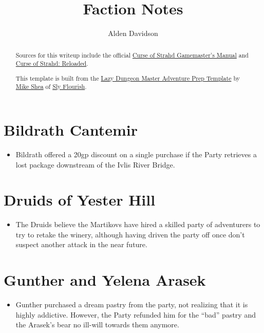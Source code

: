 \documentclass[a4paper,11pt]{article}
\title{Faction Notes}
\author{Alden Davidson}
\begin{document}
\maketitle
\tableofcontents

\begin{abstract}
  Sources for this writeup include the official
  \href{https://5e.tools/adventure.html#cos}{Curse of Strahd Gamemaster's Manual} and
  \href{https://www.reddit.com/r/CurseofStrahd/comments/9bpzbh/curse_of_strahd_reloaded_compilation_thread/}{Curse of Strahd: Reloaded}.
  
  This template is built from the
  \href{https://slyflourish.com/rotldm_template.html}{Lazy Dungeon Master Adventure Prep Template} by
  \href{https://slyflourish.com/about_mike_shea.html}{Mike Shea} of \href{https://slyflourish.com/}{Sly Flourish}.
\end{abstract}

\pagebreak
\section{Bildrath Cantemir}
\begin{itemize}
  \item Bildrath offered a 20gp discount on a single purchase if the Party retrieves a lost package downstream of
  the Ivlis River Bridge.
\end{itemize}

\section{Druids of Yester Hill}
\begin{itemize}
  \item The Druids believe the Martikovs have hired a skilled party of adventurers to try to retake the winery,
  although having driven the party off once don't suspect another attack in the near future.
\end{itemize}

\section{Gunther and Yelena Arasek}
\begin{itemize}
  \item Gunther purchased a dream pastry from the party, not realizing that it is highly addictive. However, the 
  Party refunded him for the ``bad'' pastry and the Arasek's bear no ill-will towards them anymore.
\end{itemize}
\end{document}
